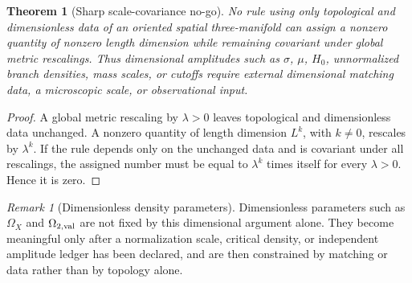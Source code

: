 \documentclass[11pt,a4paper]{article}
\numberwithin{equation}{section}
\theoremstyle{definition}
\theoremstyle{plain}
\newtheorem{theorem}[criterion]{Theorem}
\theoremstyle{remark}
\newtheorem{remark}[criterion]{Remark}
\begin{document}
\begin{theorem}[Sharp scale-covariance no-go]
No rule using only topological and dimensionless data of an oriented spatial
three-manifold can assign a nonzero quantity of nonzero length dimension while
remaining covariant under global metric rescalings.  Thus dimensional
amplitudes such as \(\sigma\), \(\mu\), \(H_0\), unnormalized branch densities,
mass scales, or cutoffs require external dimensional matching data, a
microscopic scale, or observational input.
\end{theorem}
\begin{proof}
A global metric rescaling by \(\lambda>0\) leaves topological and dimensionless
data unchanged.  A nonzero quantity of length dimension \(L^k\), with
\(k\neq0\), rescales by \(\lambda^k\).  If the rule depends only on the
unchanged data and is covariant under all rescalings, the assigned number must
be equal to \(\lambda^k\) times itself for every \(\lambda>0\).  Hence it is zero.
\end{proof}
\begin{remark}[Dimensionless density parameters]
Dimensionless parameters such as \(\Omega_X\) and \(\Omega_{2,\rm val}\) are not
fixed by this dimensional argument alone.  They become meaningful only after a
normalization scale, critical density, or independent amplitude ledger has been
declared, and are then constrained by matching or data rather than by topology
alone.
\end{remark}
\end{document}
